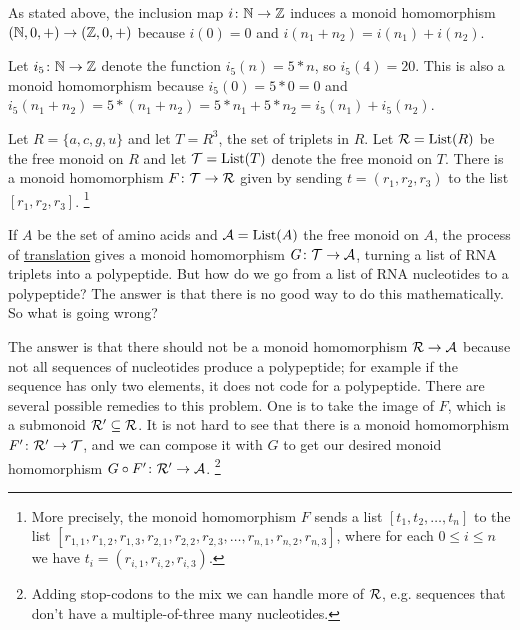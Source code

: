 \begin{exampleENG}[From $\NN$ to $\ZZ$]\label{ex:nat to int}
As stated above, the inclusion map $i\colon{\mathbb N}\rightarrow{\mathbb Z}$ induces a monoid homomorphism $({\mathbb N},0,+)\rightarrow({\mathbb Z},0,+)$ because $i(0)=0$ and $i(n_1+n_2)=i(n_1)+i(n_2)$. 

Let $i_5\colon{\mathbb N}\rightarrow{\mathbb Z}$ denote the function $i_5(n)=5*n$, so $i_5(4)=20$. This is also a monoid homomorphism because $i_5(0)=5*0=0$ and $i_5(n_1+n_2)=5*(n_1+n_2)=5*n_1+5*n_2=i_5(n_1)+i_5(n_2).$
\end{exampleENG}

\begin{exampleRUS}[From $\NN$ to $\ZZ$]\label{ex:nat to int}
\end{exampleRUS}

\begin{applicationENG}\label{app:RNA reader 1}
Let $R=\{a,c,g,u\}$ and let $T=R^3$, the set of triplets in $R$. Let $\mathcal{R}=\textnormal{List}(R)$ be the free monoid on $R$ and let $\mathcal{T}=\textnormal{List}(T)$ denote the free monoid on $T$. There is a monoid homomorphism $F\colon\mathcal{T}\rightarrow\mathcal{R}$ given by sending $t=(r_1,r_2,r_3)$ to the list $[r_1,r_2,r_3]$.
\footnote{More precisely, the monoid homomorphism $F$ sends a list $[t_1,t_2,\ldots,t_n]$ to the list $[r_{1,1},r_{1,2},r_{1,3},r_{2,1},r_{2,2},r_{2,3},\ldots,r_{n,1},r_{n,2},r_{n,3}]$, where for each $0\leq i\leq n$ we have $t_i=(r_{i,1},r_{i,2},r_{i,3})$.}

If $A$ be the set of amino acids and $\mathcal{A}=\textnormal{List}(A)$ the free monoid on $A$, the process of \href{http://en.wikipedia.org/wiki/Translation_(biology)}{\text translation} gives a monoid homomorphism $G\colon\mathcal{T}\rightarrow\mathcal{A}$, turning a list of RNA triplets into a polypeptide. But how do we go from a list of RNA nucleotides to a polypeptide? The answer is that there is no good way to do this mathematically. So what is going wrong?

The answer is that there should not be a monoid homomorphism $\mathcal{R}\rightarrow\mathcal{A}$ because not all sequences of nucleotides produce a polypeptide; for example if the sequence has only two elements, it does not code for a polypeptide. There are several possible remedies to this problem. One is to take the image of $F$, which is a submonoid $\mathcal{R}'\subseteq\mathcal{R}$. It is not hard to see that there is a monoid homomorphism $F'\colon\mathcal{R}'\rightarrow\mathcal{T}$, and we can compose it with $G$ to get our desired monoid homomorphism $G\circ F'\colon\mathcal{R}'\rightarrow\mathcal{A}$. 
\footnote{Adding stop-codons to the mix we can handle more of $\mathcal{R}$, e.g. sequences that don't have a multiple-of-three many nucleotides.}
\end{applicationENG}

